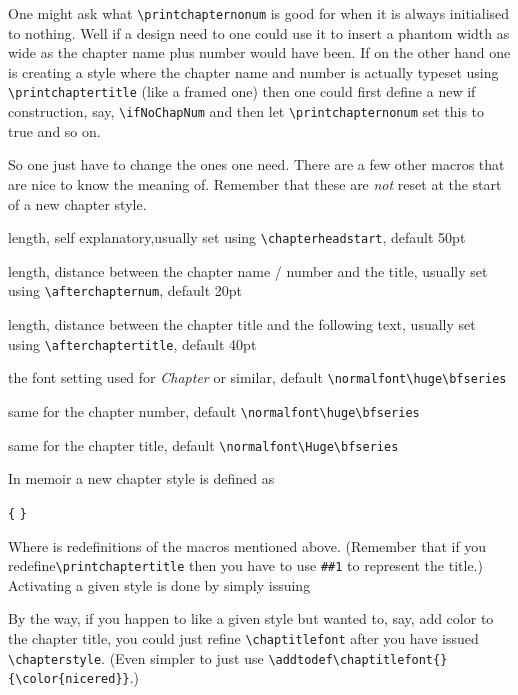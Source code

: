 One might ask what \verb+\printchapternonum+ is good for when it is
always initialised to nothing. Well if a design need to one could use
it to insert a phantom width as wide as the chapter name plus number
would have been. If on the other hand one is creating a style where
the chapter name and number is actually typeset using
\verb+\printchaptertitle+ (like a framed one) then one could first
define a new if construction, say, \verb+\ifNoChapNum+ and then let
\verb+\printchapternonum+ set this to true and so on.


So one just have to change the ones one need. There are a few other
macros that are nice to know the meaning of. Remember that these are
\emph{not} reset at the start of a new chapter style.
\begingroup
\renewcommand\descriptionlabel[1]{\hspace\labelsep\cs{#1}}
\begin{description}\firmlist
\item[beforechapskip] length, self explanatory,usually set using
  \verb+\chapterheadstart+, default 50pt
\item[midchapskip] length, distance between the chapter name / number and the
title, usually set using \verb+\afterchapternum+, default 20pt
\item[afterchapskip] length, distance between the chapter title and
  the following text, usually set using \verb+\afterchaptertitle+,
  default 40pt
\item[chapnamefont] the font setting used for \emph{Chapter} or
  similar, default \verb+\normalfont\huge\bfseries+
\item[chapnumfont] same for the chapter number, default
  \verb+\normalfont\huge\bfseries+
\item[chaptitlefont] same for the chapter title, default
  \verb+\normalfont\Huge\bfseries+ 
\end{description}
\endgroup

In memoir a new chapter style is defined as
\begin{syntax}
\texttt{\{}  
\texttt{\}}
\end{syntax}
Where  is redefinitions of the macros mentioned
above. (Remember that if you redefine\linebreak \verb+\printchaptertitle+ then
you have to use \texttt{\#\#1} to represent the title.)
Activating a given style is done by simply issuing
\begin{syntax}
\end{syntax}
By the way, if you happen to like a given style but wanted to, say,
add color to the chapter title, you could just refine
\verb+\chaptitlefont+ after you have issued \verb+\chapterstyle+. (Even
simpler to just use \verb+\addtodef\chaptitlefont{}{\color{nicered}}+.)

